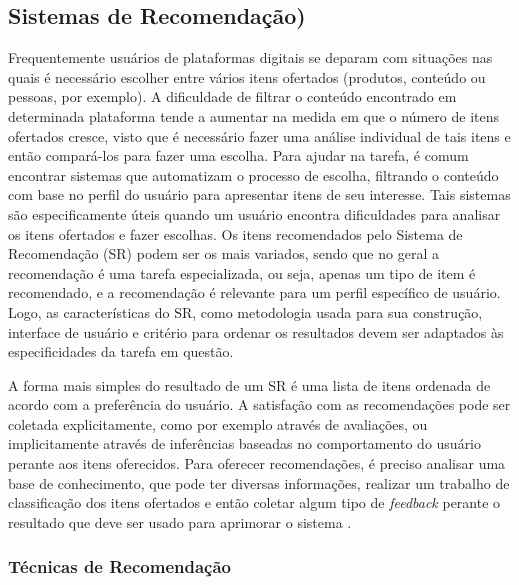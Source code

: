 \documentclass[12pt]{article}
\begin{document}
\subsection{Sistemas de Recomendação)}

Frequentemente usuários de plataformas digitais se deparam com situações nas quais é necessário escolher entre 
vários itens ofertados (produtos, conteúdo ou pessoas, por exemplo). A dificuldade de filtrar o conteúdo encontrado em determinada 
plataforma tende a aumentar na medida em que o número de itens ofertados cresce, visto que é necessário fazer uma 
análise individual de tais itens e então compará-los para fazer uma escolha. Para ajudar na tarefa, é comum encontrar 
sistemas que automatizam o processo de escolha, filtrando o conteúdo com base no perfil do usuário para apresentar 
itens de seu interesse. Tais sistemas são especificamente úteis quando um usuário encontra dificuldades para analisar os itens 
ofertados e fazer escolhas. Os itens recomendados pelo Sistema de Recomendação (SR) podem ser os mais variados, sendo que no geral a recomendação é uma tarefa especializada, ou seja, apenas um tipo de item é recomendado, e a recomendação é relevante para um perfil 
específico de usuário. Logo, as características do SR, como metodologia usada para sua construção, interface de usuário 
e critério para ordenar os resultados devem ser adaptados às especificidades da tarefa em questão\cite{ricci2011introduction}. 

A forma mais simples do resultado de um SR é uma lista de itens ordenada de acordo com a preferência do usuário. A satisfação 
com as recomendações pode ser coletada explicitamente, como por exemplo através de avaliações, ou implicitamente através de 
inferências baseadas no comportamento do usuário perante aos itens oferecidos. Para oferecer recomendações, é preciso analisar 
uma base de conhecimento, que pode ter diversas informações, realizar um trabalho de classificação dos itens ofertados e 
então coletar algum tipo de \textit{feedback} perante o resultado que deve ser usado para aprimorar o sistema \cite{shani2011evaluating}.

\subsubsection{Técnicas de Recomendação}
\end{document}
